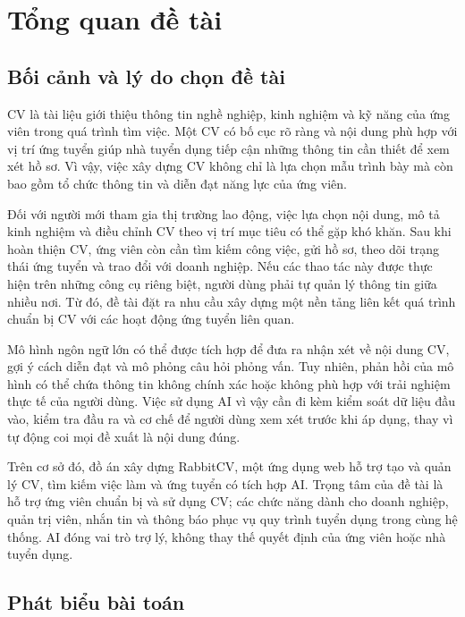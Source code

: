 \chapter{Tổng quan đề tài}

\section{Bối cảnh và lý do chọn đề tài}

CV là tài liệu giới thiệu thông tin nghề nghiệp, kinh nghiệm và kỹ năng của ứng viên trong quá trình tìm việc. Một CV có bố cục rõ ràng và nội dung phù hợp với vị trí ứng tuyển giúp nhà tuyển dụng tiếp cận những thông tin cần thiết để xem xét hồ sơ. Vì vậy, việc xây dựng CV không chỉ là lựa chọn mẫu trình bày mà còn bao gồm tổ chức thông tin và diễn đạt năng lực của ứng viên.

Đối với người mới tham gia thị trường lao động, việc lựa chọn nội dung, mô tả kinh nghiệm và điều chỉnh CV theo vị trí mục tiêu có thể gặp khó khăn. Sau khi hoàn thiện CV, ứng viên còn cần tìm kiếm công việc, gửi hồ sơ, theo dõi trạng thái ứng tuyển và trao đổi với doanh nghiệp. Nếu các thao tác này được thực hiện trên những công cụ riêng biệt, người dùng phải tự quản lý thông tin giữa nhiều nơi. Từ đó, đề tài đặt ra nhu cầu xây dựng một nền tảng liên kết quá trình chuẩn bị CV với các hoạt động ứng tuyển liên quan.

Mô hình ngôn ngữ lớn có thể được tích hợp để đưa ra nhận xét về nội dung CV, gợi ý cách diễn đạt và mô phỏng câu hỏi phỏng vấn. Tuy nhiên, phản hồi của mô hình có thể chứa thông tin không chính xác hoặc không phù hợp với trải nghiệm thực tế của người dùng. Việc sử dụng AI vì vậy cần đi kèm kiểm soát dữ liệu đầu vào, kiểm tra đầu ra và cơ chế để người dùng xem xét trước khi áp dụng, thay vì tự động coi mọi đề xuất là nội dung đúng.

Trên cơ sở đó, đồ án xây dựng RabbitCV, một ứng dụng web hỗ trợ tạo và quản lý CV, tìm kiếm việc làm và ứng tuyển có tích hợp AI. Trọng tâm của đề tài là hỗ trợ ứng viên chuẩn bị và sử dụng CV; các chức năng dành cho doanh nghiệp, quản trị viên, nhắn tin và thông báo phục vụ quy trình tuyển dụng trong cùng hệ thống. AI đóng vai trò trợ lý, không thay thế quyết định của ứng viên hoặc nhà tuyển dụng.

\section{Phát biểu bài toán}


